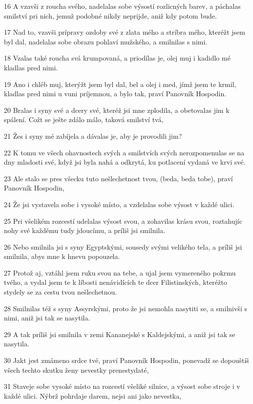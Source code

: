 \par 16 A vzavši z roucha svého, nadelalas sobe výsostí rozlicných barev, a páchalas smilství pri nich, jemuž podobné nikdy neprijde, aniž kdy potom bude.
\par 17 Nad to, vzavši prípravy ozdoby své z zlata mého a stríbra mého, kteréžt jsem byl dal, nadelalas sobe obrazu pohlaví mužského, a smilnilas s nimi.
\par 18 Vzalas také roucha svá krumpovaná, a priodílas je, olej muj i kadidlo mé kladlas pred nimi.
\par 19 Ano i chléb muj, kterýžt jsem byl dal, bel a olej i med, jímž jsem te krmil, kladlas pred nimi u vuni príjemnou, a bylo tak, praví Panovník Hospodin.
\par 20 Bralas i syny své a dcery své, kteréž jsi mne zplodila, a obetovalas jim k spálení. Cožt se ješte zdálo málo, taková smilství tvá,
\par 21 Žes i syny mé zabíjela a dávalas je, aby je provodili jim?
\par 22 K tomu ve všech ohavnostech svých a smilstvích svých nerozpomenulas se na dny mladosti své, když jsi byla nahá a odkrytá, ku potlacení vydaná ve krvi své.
\par 23 Ale stalo se pres všecku tuto nešlechetnost tvou, (beda, beda tobe), praví Panovník Hospodin,
\par 24 Že jsi vystavela sobe i vysoké místo, a vzdelalas sobe výsost v každé ulici.
\par 25 Pri všelikém rozcestí udelalas výsost svou, a zohavilas krásu svou, roztahujíc nohy své každému tudy jdoucímu, a príliš jsi smilnila.
\par 26 Nebo smilnila jsi s syny Egyptskými, sousedy svými velikého tela, a príliš jsi smilnila, abys mne k hnevu popouzela.
\par 27 Protož aj, vztáhl jsem ruku svou na tebe, a ujal jsem vymereného pokrmu tvého, a vydal jsem te k líbosti nenávidících te dcer Filistinských, kteréžto stydely se za cestu tvou nešlechetnou.
\par 28 Smilnilas též s syny Assyrskými, proto že jsi nemohla nasytiti se, a smilnivši s nimi, aniž jsi tak se nasytila.
\par 29 A tak príliš jsi smilnila v zemi Kananejské s Kaldejskými, a aniž jsi tak se nasytila.
\par 30 Jakt jest zmámeno srdce tvé, praví Panovník Hospodin, ponevadž se dopouštíš všech techto skutku ženy nevestky prenestydaté,
\par 31 Staveje sobe vysoké místo na rozcestí všeliké silnice, a výsost sobe stroje i v každé ulici. Nýbrž pohrdaje darem, nejsi ani jako nevestka,
